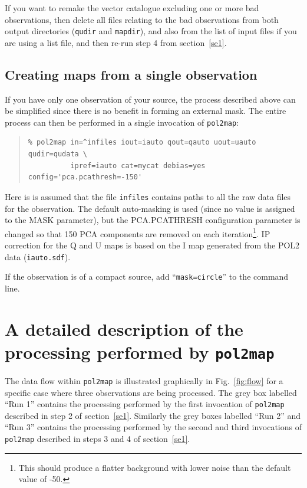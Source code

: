 \documentclass[twoside,11pt]{starlink}
\begin{document}
If you want to remake the vector catalogue excluding one or more bad
observations, then delete all files relating to the bad observations from
both output directories (\texttt{qudir} and \texttt{mapdir}), and also
from the list of input files if you are using a list file, and then
re-run step 4 from section~\ref{se1}.

\subsection{\label{sec:oneobs}Creating maps from a single observation}
If you have only one observation of your source, the process described
above can be simplified since there is no benefit in forming an external
mask. The entire process can then be performed in a single invocation of
\texttt{pol2map}:

\begin{quote}
\begin{verbatim}
% pol2map in=^infiles iout=iauto qout=qauto uout=uauto qudir=qudata \
          ipref=iauto cat=mycat debias=yes config='pca.pcathresh=-150'
\end{verbatim}
\end{quote}

Here is is assumed that the file \texttt{infiles} contains paths to all
the raw data files for the observation. The default auto-masking is
used (since no value is assigned to the MASK parameter), but the
PCA.PCATHRESH configuration parameter is changed so that 150 PCA
components are removed on each iteration\footnote{This should produce a
flatter background with lower noise than the default value of -50.}. IP
correction for the Q and U maps is based on the I map generated from the
POL2 data (\texttt{iauto.sdf}).

If the observation is of a compact source, add ``\texttt{mask=circle}''
to the command line.

\section{A detailed description of the processing performed by \texttt{pol2map}}

The data flow within \texttt{pol2map} is illustrated graphically in
Fig.~\ref{fig:flow} for a specific case where three observations are
being processed. The grey box labelled ``Run 1'' contains the processing
performed by the first invocation of \texttt{pol2map} described in step 2
of section~\ref{se1}. Similarly the grey boxes labelled ``Run 2'' and ``Run
3'' contains the processing performed by the second and third invocations
of \texttt{pol2map} described in steps 3 and 4 of section~\ref{se1}.
\end{document}
